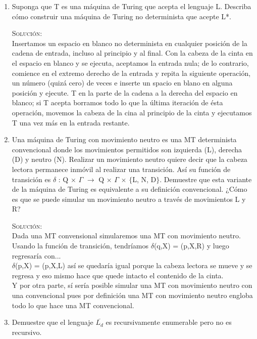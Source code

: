 \documentclass[letterpaper,10pt]{article}
\begin{document}
\begin{enumerate}
	
    \item Suponga que T es una máquina de Turing que acepta el lenguaje L. Describa cómo construir
una máquina de Turing no determinista que acepte L*.
    
    \textsc{Solución:}
    \\
    Insertamos un espacio en blanco no determinista en cualquier posición de la cadena de entrada, incluso al principio y al final.
    Con la cabeza de la cinta en el espacio en blanco y se ejecuta, aceptamos la entrada nula; de lo contrario, comience en el extremo derecho de la entrada y repita la siguiente operación, un número (quizá cero) de veces e inserte un spacio en blano en alguna posición y ejecute. T en la parte de la cadena a la derecha del espacio en blanco; si T acepta borramos todo lo que la última iteración de ésta operación, movemos la cabeza de la cina al principio de la cinta y ejecutamos T una vez más en la entrada restante.
    \\
	
    \item Una máquina de Turing con movimiento neutro es una MT determinista convencional
donde los movimientos permitidos son izquierda (L), derecha (D) y neutro (N). Realizar un movimiento neutro quiere decir que la cabeza lectora permanece inmóvil al realizar una transición. 
Así su función de transición es $\delta$ : Q $\times$ $\Gamma$ $\rightarrow$ Q $\times$ $\Gamma$ $\times$ $\lbrace$L, N, D$\rbrace$. 
Demuestre que esta variante de la máquina de Turing es equivalente a su definición convencional. ¿Cómo es que se puede simular un movimiento neutro a través de movimientos L y R?
    
    \textsc{Solución:}
    \\
    Dada una MT convensional simularemos una MT con movimiento neutro.
    Usando la función de transición, tendríamos $\delta$(q,X) = (p,X,R) y luego regresaría con...\\
    $\delta$(p,X) = (p,X,L) así se quedaría igual porque la cabeza lectora se mueve y se regresa y eso mismo hace que quede intacto el contenido de la cinta.\\
    Y por otra parte, sí sería posible simular una MT con movimiento neutro con una convencional pues por definición una MT con movimiento neutro engloba todo lo que hace una MT convencional.\\
        
    \item Demuestre que el lenguaje $\overline{L_{d} }$ es recursivamente enumerable pero no es recursivo.
    

\end{enumerate}
\end{document}
